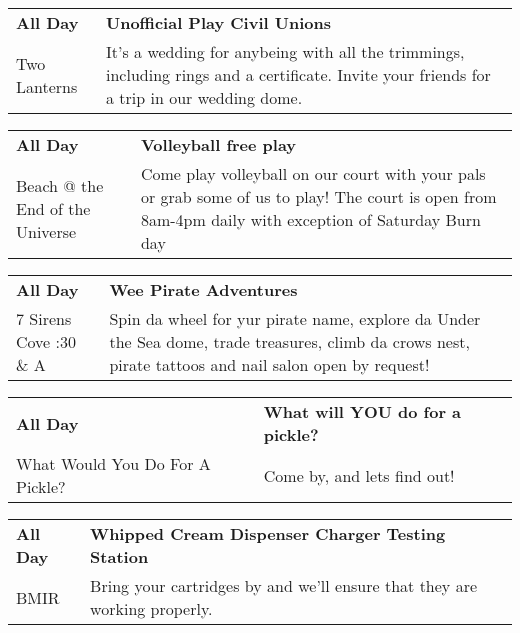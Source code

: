 \begin{tabular}{ p{1in} p{2.2in} }
    \textbf{All Day} & \textbf{Unofficial Play Civil Unions} \\
    Two Lanterns \newline  & It's a wedding for anybeing with all the trimmings, including rings and a certificate.  Invite your friends for a trip in our wedding dome. \\
    \hline 
\end{tabular}
    
\begin{tabular}{ p{1in} p{2.2in} }
    \textbf{All Day} & \textbf{Volleyball free play } \\
    Beach @ the End of the Universe \newline  & Come play volleyball on our court with your pals or grab some of us to play! The court is open from 8am-4pm daily with exception of Saturday Burn day \\
    \hline 
\end{tabular}
    
\begin{tabular}{ p{1in} p{2.2in} }
    \textbf{All Day} & \textbf{Wee Pirate Adventures} \\
    7 Sirens Cove \newline 7:30 \& A & Spin da wheel for yur pirate name, explore da Under the Sea dome, trade treasures, climb da crows nest, pirate tattoos and nail salon open by request! \\
    \hline 
\end{tabular}
    
\begin{tabular}{ p{1in} p{2.2in} }
    \textbf{All Day} & \textbf{What will YOU do for a pickle?} \\
    What Would You Do For A Pickle? \newline  & Come by, and lets find out! \\
    \hline 
\end{tabular}
    
\begin{tabular}{ p{1in} p{2.2in} }
    \textbf{All Day} & \textbf{Whipped Cream Dispenser Charger Testing Station} \\
    BMIR \newline  & Bring your cartridges by and we'll ensure that they are working properly. \\
    \hline 
\end{tabular}
    
